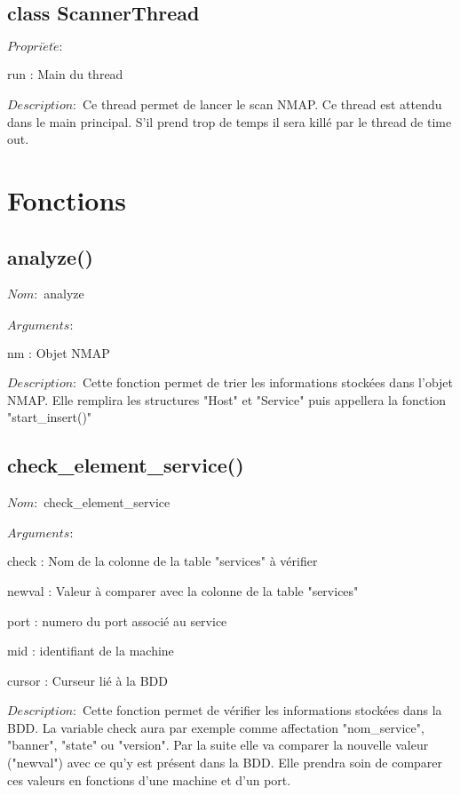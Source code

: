 \documentclass[12pt]{report}
\begin{document}
		\section{class ScannerThread}
			{\setlength{\parindent}{0cm}
			$Propri\acute{e}t\acute{e} :$
			}
			\begin{description}
				\item run : Main du thread
			\end{description}
			$Description :$ Ce thread permet de lancer le scan NMAP. Ce thread est attendu dans le main principal. S'il prend trop de temps il sera killé par le thread de time out.
	\chapter{Fonctions}
		\section{analyze()}
			{\setlength{\parindent}{0cm}
			$Nom :$ analyze\\\\
			}
			$Arguments :$
			\begin{description}
				\item nm : Objet NMAP\\
			\end{description}
			$Description : $ Cette fonction permet de trier les informations stockées dans l'objet NMAP. Elle remplira les structures "Host" et "Service" puis appellera la fonction "start\_insert()"
		\section{check\_element\_service()}
			{\setlength{\parindent}{0cm}
			$Nom :$ check\_element\_service\\\\
			}
			$Arguments :$
			\begin{description}
				\item check : Nom de la colonne de la table "services" à vérifier
				\item newval : Valeur à comparer avec la colonne de la table "services"
				\item port : numero du port associé au service
				\item mid : identifiant de la machine
				\item cursor : Curseur lié à la BDD\\
			\end{description}
			$Description : $ Cette fonction permet de vérifier les informations stockées dans la BDD. La variable check aura par exemple comme affectation "nom\_service", "banner", "state" ou "version". Par la suite elle va comparer la nouvelle valeur ("newval") avec ce qu'y est présent dans la BDD.  Elle prendra soin de comparer ces valeurs en fonctions d'une machine et d'un port.
\end{document}
